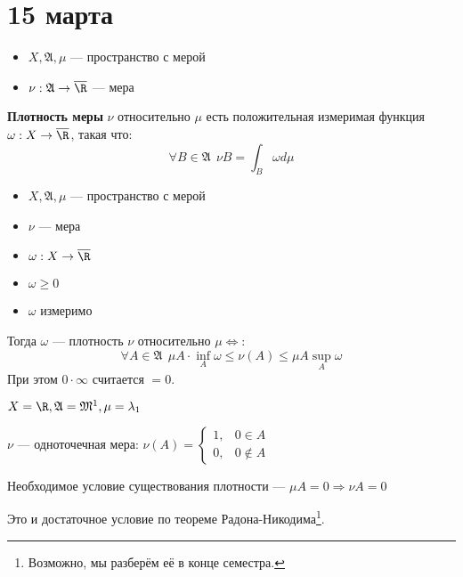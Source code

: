 \chapter{15 марта}

\begin{definition}\itemfix
    \begin{itemize}
        \item \(X, \mathfrak{A}, \mu\) --- пространство с мерой
        \item \(\nu : \mathfrak{A} \to \overline \R\) --- мера
    \end{itemize}

    \textbf{Плотность меры} \(\nu\) относительно \(\mu\) есть положительная измеримая функция \(\omega : X \to \overline \R\), такая что:
    \[\forall B\in \mathfrak{A} \ \ \nu B = \int_B \omega d\mu\]
\end{definition}

\begin{theorem}\itemfix
    \label{критерий плотности}
    \begin{itemize}
        \item \(X, \mathfrak{A}, \mu\) --- пространство с мерой
        \item \(\nu\) --- мера
        \item \(\omega : X \to \overline\R\)
        \item \(\omega \geq 0\)
        \item \(\omega\) измеримо
    \end{itemize}

    Тогда \(\omega\) --- плотность \(\nu\) относительно \(\mu \Leftrightarrow\):
    \[\forall A\in \mathfrak{A} \ \ \mu A \cdot \inf_A \omega \leq \nu(A) \leq \mu A \sup_A \omega\]
    При этом \(0\cdot \infty\) считается \( = 0\).
\end{theorem}

\begin{example}
    \(X = \R, \mathfrak{A} = \mathfrak{M}^1, \mu = \lambda_1\)

    \(\nu\) --- одноточечная мера: \(\nu(A) =\begin{cases}
        1, & 0\in A     \\
        0, & 0\notin A
    \end{cases}\)

    Необходимое условие существования плотности --- \(\mu A = 0 \Rightarrow \nu A = 0\)

    Это и достаточное условие по теореме Радона-Никодима\footnote{Возможно, мы разберём её в конце семестра.}.
\end{example}

